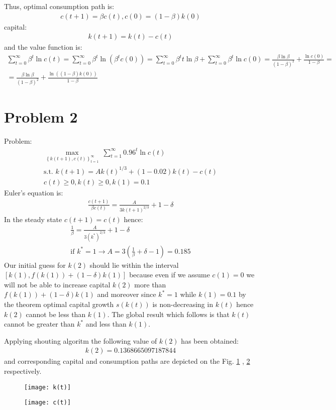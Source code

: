 \documentclass[a4paper]{article}
\begin{document}
\begin{enumerate}
Thus, optimal consumption path is:
\begin{align*}
c(t+1) = \beta c(t), c(0) = (1-\beta)k(0)
\end{align*}
capital:
\begin{align*}
k(t+1) = k(t) - c(t)
\end{align*}
and the value function is:
\begin{align*}
\sum_{t=0}^{\infty} \beta^t \ln c(t) = \sum_{t=0}^{\infty} \beta^{t} \ln (\beta^t c(0)) = \sum_{t=0}^{\infty} \beta^t t \ln \beta + \sum_{t=0}^{\infty} \beta^t \ln c(0) = \frac{\beta \ln \beta}{(1-\beta)^2} + \frac{\ln c(0)}{1 - \beta } = \\
=\frac{\beta \ln \beta}{(1-\beta)^2} + \frac{\ln((1-\beta)k(0))}{1-\beta}
\end{align*}
\end{enumerate}

\section*{Problem 2}
Problem:
\begin{align*}
\underset{\left\{k(t+1), c(t)\right\}_{t=1}^{\infty}}{\max}\ \sum_{t=1}^{\infty} 0.96^t \ln c(t)\\
\text{s.t.\ } k(t+1) = Ak(t)^{1/3} + (1-0.02)k(t) - c(t)\\
c(t) \ge 0, k(t) \ge 0, k(1) = 0.1
\end{align*}
Euler's equation is:
\begin{align*}
\frac{c(t+1)}{\beta c(t)} = \frac{A}{3k(t+1)^{2/3}} + 1 - \delta
\end{align*}
In the steady state $c(t+1) = c(t)$ hence:
\begin{align*}
\frac{1}{\beta} = \frac{A}{3(k^*)^{2/3}} + 1 - \delta\\
\text{if } k^* = 1 \to A = 3(\frac{1}{\beta} + \delta - 1) = 0.185
\end{align*}
Our initial guess for $k(2)$ should lie within the interval $ [k(1), f(k(1)) + (1 - \delta)k(1)]$ because even if we assume $c(1) = 0$ we will not be able to increase capital $k(2)$ more than $f(k(1)) + (1 - \delta)k(1)$ and moreover since $k^* = 1$ while $k(1) = 0.1$ by the theorem optimal capital growth $s(k(t))$ is non-decreasing in $k(t)$ hence $k(2)$ cannot be less than $k(1)$. The global result which follows is that $k(t)$ cannot be greater than $k^*$ and less than $k(1)$.



Applying shouting algoritm the following value of $k(2)$ has been obtained:
\begin{align*}
k(2) = 0.1368665097187844
\end{align*}
and corresponding capital and consumption paths are depicted on the Fig. \ref{fig1} , \ref{fig2} respectively.
\begin{figure}[h]
	\centering
	\texttt{[image: k(t)]}
	\caption{}\label{fig1}
\end{figure}
\begin{figure}[h]
	\centering
	\texttt{[image: c(t)]}
	\caption{}\label{fig2}
\end{figure}
\end{document}
